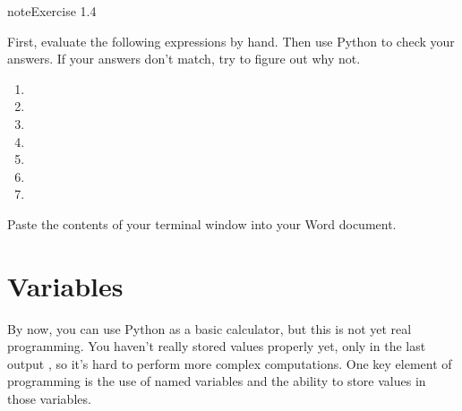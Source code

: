 \documentclass[letterpaper,10pt,english]{jupyterBook}
\begin{document}
\begin{sphinxVerbatim}[commandchars=\\\{\}]
  
\end{sphinxVerbatim}

\begin{sphinxadmonition}{note}{Exercise 1.4}

\sphinxAtStartPar
First, evaluate the following expressions by hand. Then use Python to check your answers. If your answers don’t match, try to figure out why not.
\begin{enumerate}
%
\item {} 
\sphinxAtStartPar
{}

\item {} 
\sphinxAtStartPar
{}

\item {} 
\sphinxAtStartPar
{}

\item {} 
\sphinxAtStartPar
{}

\item {} 
\sphinxAtStartPar
{}

\item {} 
\sphinxAtStartPar
{}

\item {} 
\sphinxAtStartPar
{}

\end{enumerate}

\sphinxAtStartPar
Paste the contents of your terminal window into your Word document.
\end{sphinxadmonition}


\section{Variables}
\label{\detokenize{notebooks/01_GettingStarted/01_GettingStarted_student:variables}}
\sphinxAtStartPar
By now, you can use Python as a basic calculator, but this is not yet real programming. You haven’t really stored values properly yet, only in the last output \sphinxcode{\sphinxupquote{\_}}, so it’s hard to perform more complex computations. One key element of programming is the use of named variables and the ability to store values in those variables.
\end{document}
